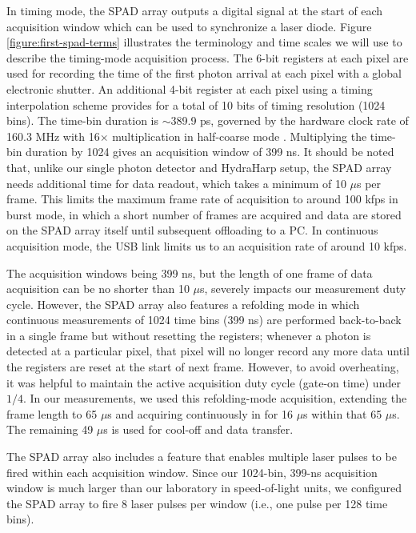 In timing mode, the SPAD array outputs a digital signal at the start of each acquisition window which can be used to synchronize a laser diode. Figure \ref{figure:first-spad-terms} illustrates the terminology and time scales we will use to describe the timing-mode acquisition process. The 6-bit registers at each pixel are used for recording the time of the first photon arrival at each pixel with a global electronic shutter. An additional 4-bit register at each pixel using a timing interpolation scheme \cite{villa-thesis} provides for a total of 10 bits of timing resolution (1024 bins). The time-bin duration is $\sim$389.9 ps, governed by the hardware clock rate of 160.3 MHz with 16$\times$ multiplication in half-coarse mode \cite{villa-thesis}. Multiplying the time-bin duration by 1024 gives an acquisition window of 399 ns. It should be noted that, unlike our single photon detector and HydraHarp setup, the SPAD array needs additional time for data readout, which takes a minimum of 10 $\mu$s per frame. This limits the maximum frame rate of acquisition to around 100 kfps in burst mode, in which a short number of frames are acquired and data are stored on the SPAD array itself until subsequent offloading to a PC. In continuous acquisition mode, the USB link limits us to an acquisition rate of around 10 kfps.

The acquisition windows being 399 ns, but the length of one frame of data acquisition can be no shorter than 10 $\mu$s, severely impacts our measurement duty cycle. However, the SPAD array also features a refolding mode in which continuous measurements of 1024 time bins (399 ns) are performed back-to-back in a single frame but without resetting the registers; whenever a photon is detected at a particular pixel, that pixel will no longer record any more data until the registers are reset at the start of next frame. However, to avoid overheating, it was helpful to maintain the active acquisition duty cycle (gate-on time) under $1/4$. In our measurements, we used this refolding-mode acquisition, extending the frame length to 65 $\mu$s and acquiring continuously in for 16 $\mu$s within that 65 $\mu$s. The remaining 49 $\mu$s is used for cool-off and data transfer.

The SPAD array also includes a feature that enables multiple laser pulses to be fired within each acquisition window. Since our 1024-bin, 399-ns acquisition window is much larger than our laboratory in speed-of-light units, we configured the SPAD array to fire 8 laser pulses per window (i.e., one pulse per 128 time bins).

